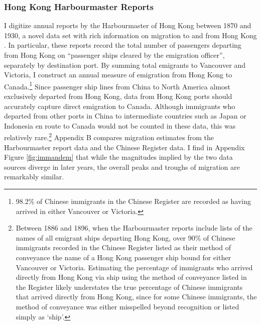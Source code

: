 \subsubsection{Hong Kong Harbourmaster Reports}
I digitize annual reports by the Harbourmaster of Hong Kong between 1870 and 1930, a novel data set with rich information on migration to and from Hong Kong \citep{hkharbourmaster}. In particular, these reports record the total number of passengers departing from Hong Kong on ``passenger ships cleared by the emigration officer'', separately by destination port. By summing total emigrants to Vancouver and Victoria, I construct an annual measure of emigration from Hong Kong to Canada.\footnote{98.2\% of Chinese immigrants in the Chinese Register are recorded as having arrived in either Vancouver or Victoria.} 
Since passenger ship lines from China to North America almost exclusively departed from Hong Kong, data from Hong Kong ports should accurately capture direct emigration to Canada. Although immigrants who departed from other ports in China to intermediate countries such as Japan or Indonesia en route to Canada would not be counted in these data, this was relatively rare.\footnote{Between 1886 and 1896, when the Harbourmaster reports include lists of the names of all emigrant ships departing Hong Kong, over 90\% of Chinese immigrants recorded in the Chinese Register listed as their method of conveyance the name of a Hong Kong passenger ship bound for either Vancouver or Victoria. 
Estimating the percentage of immigrants who arrived directly from Hong Kong via ship using the method of conveyance listed in the Register likely understates the true percentage of Chinese immigrants that arrived directly from Hong Kong, since for some Chinese immigrants, the method of conveyance was either misspelled beyond recognition or listed simply as `ship'.} 
Appendix B compares migration estimates from the Harbourmaster report data and the Chinese Register data. I find in Appendix Figure \ref{fig:immandem} that while the magnitudes implied by the two data sources diverge in later years, the overall peaks and troughs of migration are remarkably similar.

